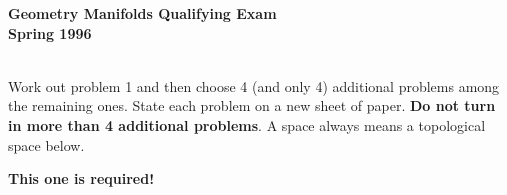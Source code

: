 \documentclass{article}
\begin{document}






\begin{center}\begin{LARGE}
{\bf Geometry Manifolds Qualifying Exam}\\ 
{\bf Spring 1996}\\ \end{LARGE}
\end{center}
\vspace{0.1in}
\noindent\hrulefill\\

Work out problem 1 and then choose 4 (and only 4) additional problems
among the remaining ones. State each problem on a new sheet of paper.
{\bf Do not turn in more than 4 additional problems}. A space always means
a topological space below.

{\bf This one is required!}
\end{document}
